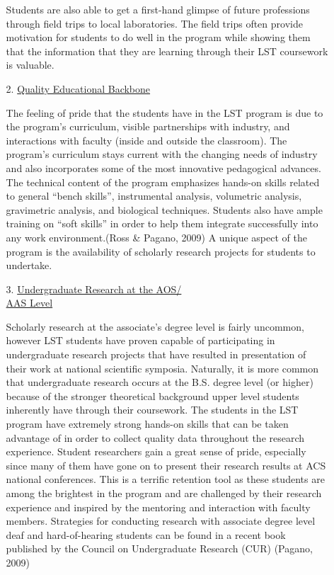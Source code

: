 \documentclass[11.5pt]{sig-alternate} %
\begin{document}
\begin{large}
\begin{itemize}
\begin{enumerate}
\begin{sloppypar}
        Students are also able to get a first-hand glimpse of future professions through field trips to local laboratories. The field trips often provide motivation for students to do well in the program while showing them that the information that they are learning through their LST coursework is valuable.\end{sloppypar}
        \item[2.] \underline{Quality Educational Backbone}
        \begin{sloppypar}The feeling of pride that the students have in the LST program is due to the program’s curriculum, visible partnerships with industry, and interactions with faculty (inside and outside the classroom). The program’s curriculum stays current with the changing needs of industry and also incorporates some of the most innovative pedagogical advances. The technical content of the program emphasizes hands-on skills related to general “bench skills”, instrumental analysis, volumetric analysis, gravimetric analysis, and biological techniques. Students also have ample training on “soft skills” in order to help them integrate successfully into any work environment.(Ross \& Pagano, 2009) A unique aspect of the program is the availability of scholarly research projects for students to undertake.\end{sloppypar}
        \item[3.] \underline{Undergraduate Research at the AOS/}\\ \underline{AAS Level}
        \begin{sloppypar}Scholarly research at the associate’s degree level is fairly uncommon, however LST students have proven capable of participating in undergraduate research projects that have resulted in presentation of their work at national scientific symposia. Naturally, it is more common that undergraduate research occurs at the B.S. degree level (or higher) because of the stronger theoretical background upper level students inherently have through their coursework. The students in the LST program have extremely strong hands-on skills that can be taken advantage of in order to collect quality data throughout the research experience. Student researchers gain a great sense of pride, especially since many of them have gone on to present their research results at ACS national conferences. This is a terrific retention tool as these students are among the brightest in the program and are challenged by their research experience and inspired by the mentoring and interaction with faculty members. Strategies for conducting research with associate degree level deaf and hard-of-hearing students can be found in a recent book published by the Council on Undergraduate Research (CUR) (Pagano, 2009)\end{sloppypar}
    \end{enumerate}
\end{itemize}


\end{large}
\end{document}
